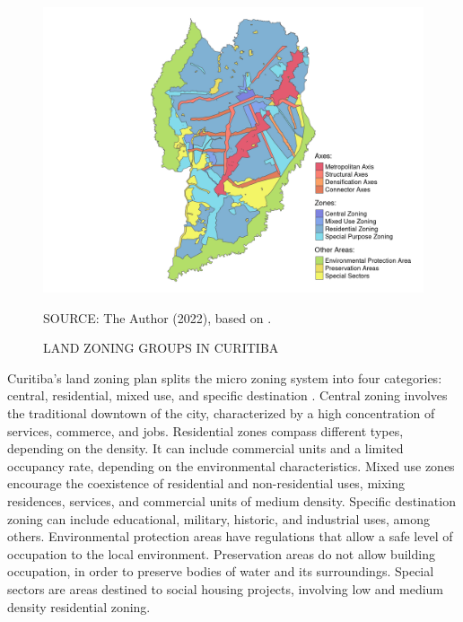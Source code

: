 \begin{figure}[!htbp]
    \centering\footnotesize
    \captionsetup{font=footnotesize}
    \caption{LAND ZONING GROUPS IN CURITIBA}
    \includegraphics{fig/zoning_map.png}
    \label{fig:zoning}
    \par SOURCE: The Author (2022), based on \textcite{IPPUC2021}.
\end{figure}


Curitiba's land zoning plan splits the micro zoning system into four categories: central, residential, mixed use, and specific destination \cite{Curitiba2019a}. Central zoning involves the traditional downtown of the city, characterized by a high concentration of services, commerce, and jobs. Residential zones compass different types, depending on the density. It can include commercial units and a limited occupancy rate, depending on the environmental characteristics. Mixed use zones encourage the coexistence of residential and non-residential uses, mixing residences, services, and commercial units of medium density. Specific destination zoning can include educational, military, historic, and industrial uses, among others. Environmental protection areas have regulations that allow a safe level of occupation to the local environment. Preservation areas do not allow building occupation, in order to preserve bodies of water and its surroundings. Special sectors are areas destined to social housing projects, involving low and medium density residential zoning. 


